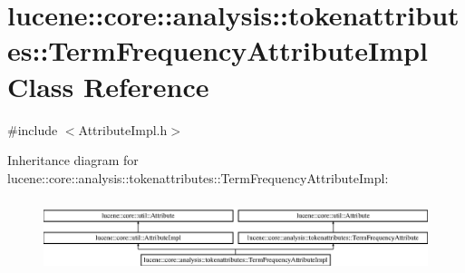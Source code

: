 \hypertarget{classlucene_1_1core_1_1analysis_1_1tokenattributes_1_1TermFrequencyAttributeImpl}{}\section{lucene\+:\+:core\+:\+:analysis\+:\+:tokenattributes\+:\+:Term\+Frequency\+Attribute\+Impl Class Reference}
\label{classlucene_1_1core_1_1analysis_1_1tokenattributes_1_1TermFrequencyAttributeImpl}


{\ttfamily \#include $<$Attribute\+Impl.\+h$>$}

Inheritance diagram for lucene\+:\+:core\+:\+:analysis\+:\+:tokenattributes\+:\+:Term\+Frequency\+Attribute\+Impl\+:\begin{figure}[H]
\begin{center}
\leavevmode
\includegraphics[height=2.137405cm]{classlucene_1_1core_1_1analysis_1_1tokenattributes_1_1TermFrequencyAttributeImpl}
\end{center}
\end{figure}
